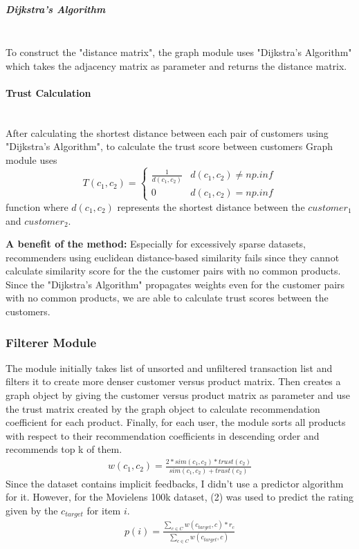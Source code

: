 \documentclass[12pt]{article}
\begin{document}
	\subparagraph{Dijkstra's Algorithm}\mbox{}\\
	To construct the "distance matrix", the graph module uses "Dijkstra's Algorithm"\cite{Dijkstra} which takes the adjacency matrix as parameter and returns the distance matrix.
	
	\paragraph{Trust Calculation}\mbox{}\\
	After calculating the shortest distance between each pair of customers using "Dijkstra's Algorithm", to calculate the trust score between customers Graph module uses
	\begin{equation*} 
	T(c_{1}, c_{2})= \left\{
	\begin{array}{lr} 
	\frac{1}{d(c_{1}, c_{2})} & d(c_{1}, c_{2}) \neq np.inf \\
	0 & d(c_{1}, c_{2}) = np.inf
	\end{array}
	\right.
	\end{equation*}
	function where $d(c_{1}, c_{2})$ represents the shortest distance between the $customer_{1}$ and $customer_{2}$.
	
	\textbf{A benefit of the method:} Especially for excessively sparse datasets, recommenders using euclidean distance-based similarity fails since they cannot calculate similarity score for the the customer pairs with no common products.	Since the  "Dijkstra's Algorithm" propagates weights even for the customer pairs with no common products, we are able to calculate trust scores between the customers.
	
	\subsubsection{Filterer Module} The module initially takes list of unsorted and unfiltered transaction list and filters it to create more denser customer versus product matrix. Then creates a graph object by giving the customer versus product matrix as parameter and use the trust matrix created by the graph object to calculate recommendation coefficient for each product. Finally, for each user, the module sorts all products with respect to their recommendation coefficients in descending order and recommends top k of them.
	\begin{equation} 
	\begin{split}
	w(c_{1}, c_{2}) = \frac{2*sim(c_{1},c_{2})*trust(c_{2})}{sim(c_{1},c_{2})+trust(c_{2})}
	\end{split}
	\end{equation}
	Since the dataset contains implicit feedbacks, I didn't use a predictor algorithm for it. However, for the Movielens 100k dataset\cite{Movielens}, (2) was used to predict the rating given by the $c_{target}$ for item $i$.
	\begin{equation} 
	\begin{split}
	p(i) = \frac{\sum_{c \in C}^{} w(c_{target}, c)*r_{c}}{\sum_{c \in C}^{} w(c_{target}, c)}
	\end{split}
	\end{equation}
\end{document}
